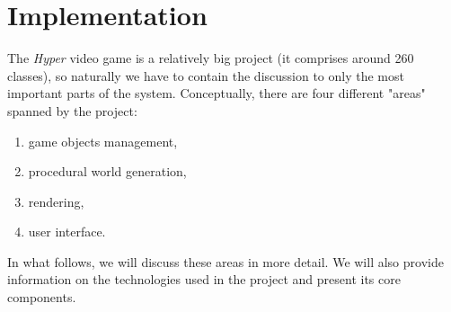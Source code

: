 \chapter{Implementation} \label{ch:implementation}
The \textit{Hyper} video game is a relatively big project (it comprises around 260 classes), so naturally we have to contain the discussion to only the most important parts of the system.
Conceptually, there are four different "areas" spanned by the project:
\begin{enumerate}
  \item game objects management,
  \item procedural world generation,
  \item rendering,
  \item user interface.
\end{enumerate}

In what follows, we will discuss these areas in more detail.
We will also provide information on the technologies used in the project and present its core components.







